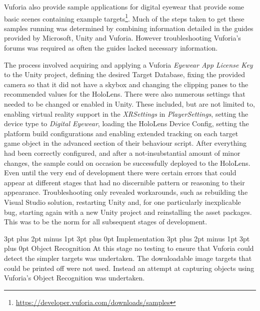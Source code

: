 \documentclass[12pt,a4paper,oneside]{article}
\makeatletter
\renewcommand\subsubsection{\@startsection {subsubsection}{1}{0mm} %
	                           {3pt plus 2pt minus 1pt} %
	                           {3pt plus 0pt} %
	                           {\normalfont\bfseries}}
\renewcommand\subsection{\@startsection {subsection}{1}{0mm} %
                               {3pt plus 2pt minus 1pt} %
                               {3pt plus 0pt} %
                               {\large\bfseries}}
\makeatother
\begin{document}
Vuforia also provide sample applications for digital eyewear that provide some basic scenes containing example targets\footnote{\url{https://developer.vuforia.com/downloads/samples}}. Much of the steps taken to get these samples running was determined by combining information detailed in the guides provided by Microsoft, Unity and Vuforia. However troubleshooting Vuforia's forums was required as often the guides lacked necessary information. 

The process involved acquiring and applying a Vuforia \textit{Eyewear App License Key} to the Unity project, defining the desired Target Database, fixing the provided camera so that it did not have a skybox and changing the clipping panes to the recommended values for the HoloLens. There were also numerous settings that needed to be changed or enabled in Unity. These included, but are not limited to, enabling virtual reality support in the \textit{XRSettings} in \textit{PlayerSettings}, setting the device type to \textit{Digital Eyewear}, loading the HoloLens Device Config, setting the platform build configurations and enabling extended tracking on each target game object in the advanced section of their behaviour script.  After everything had been correctly configured, and after a not-insubstantial amount of minor changes, the sample could on occasion be successfully deployed to the HoloLens. Even until the very end of development there were certain errors that could appear at different stages that had no discernible pattern or reasoning to their appearance. Troubleshooting only revealed workarounds, such as rebuilding the Visual Studio solution, restarting Unity and, for one particularly inexplicable bug, starting again with a new Unity project and reinstalling the asset packages. This was to be the norm for all subsequent stages of development.

\subsection{Implementation}
\subsubsection{Object Recognition}
At this stage no testing to ensure that Vuforia could detect the simpler targets was undertaken. The downloadable image targets that could be printed off were not used. Instead an attempt at capturing objects using Vuforia's Object Recognition was undertaken.
\end{document}
